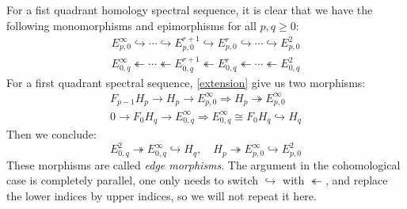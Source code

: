 \documentclass[a4paper,11pt]{article}
\theoremstyle{definition}
\theoremstyle{remark}
\begin{document}
For a fist quadrant homology spectral sequence, it is clear that we have the following monomorphisms and epimorphisms for all $p,q\geq 0$:
\[
\begin{gathered}
	E^{\infty}_{p,0}\hookrightarrow\cdots \hookrightarrow E^{r+1}_{p,0}\hookrightarrow E^{r}_{p,0}\hookrightarrow\cdots\hookrightarrow E^2_{p,0}\\
	E^{\infty}_{0,q}\twoheadleftarrow\cdots \twoheadleftarrow E^{r+1}_{0,q}\twoheadleftarrow E^{r}_{0,q}\twoheadleftarrow\cdots\twoheadleftarrow E^2_{0,q}
\end{gathered}
\]
For a first quadrant spectral sequence, \eqref{extension} give us two morphisms:
\[
\begin{gathered}
F_{p-1}H_p\to H_{p}\to E^\infty_{p,0} \Rightarrow H_p\twoheadrightarrow E^{\infty}_{p,0}\\
0\to F_{0}H_{q}\to E^\infty_{0,q}\Rightarrow E^\infty_{0,q} \cong F_{0}H_{q}\hookrightarrow H_q
\end{gathered}
\]
Then we conclude:
\begin{equation}
	\label{edge}
	E^2_{0,q}\twoheadrightarrow E^{\infty}_{0,q}\hookrightarrow H_q,\quad H_p\twoheadrightarrow E^{\infty}_{p,0}\hookrightarrow E^2_{p,0}
\end{equation}
These morphisms are called {\itshape edge morphisms}. The argument in the cohomological case is completely parallel, one only needs to switch $\hookrightarrow$ with $\twoheadleftarrow$, and replace the lower indices by upper indices, so we will not repeat it here.
\end{document}
